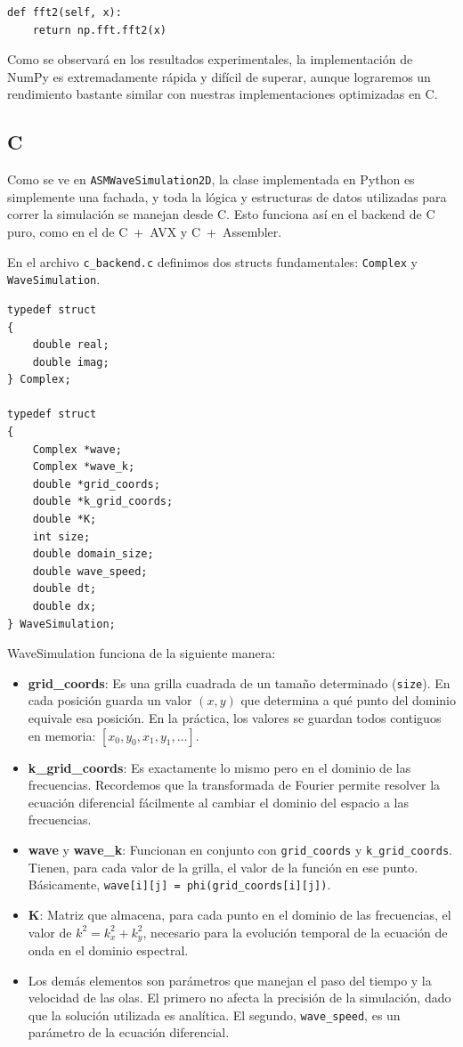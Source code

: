 \documentclass[a4paper]{article}
\begin{document}
\begin{verbatim}
def fft2(self, x):
    return np.fft.fft2(x)
\end{verbatim}

Como se observará en los resultados experimentales, la implementación de NumPy es extremadamente rápida y difícil de superar, aunque lograremos
un rendimiento bastante similar con nuestras implementaciones optimizadas en C.

\subsection{C}
Como se ve en \texttt{ASMWaveSimulation2D}, la clase implementada en Python es simplemente una fachada, y toda la lógica y estructuras de datos utilizadas para correr la simulación se manejan desde C. Esto funciona así en el backend de C puro, como en el de C~+~AVX y C~+~Assembler.

En el archivo \texttt{c\_backend.c} definimos dos structs fundamentales: \texttt{Complex} y \texttt{WaveSimulation}.

\begin{verbatim}
typedef struct
{
    double real;
    double imag;
} Complex;

typedef struct
{
    Complex *wave;
    Complex *wave_k;
    double *grid_coords;
    double *k_grid_coords;
    double *K;
    int size;
    double domain_size;
    double wave_speed;
    double dt;
    double dx;
} WaveSimulation;
\end{verbatim}

WaveSimulation funciona de la siguiente manera:
\begin{itemize}
    \item \textbf{grid\_coords}: Es una grilla cuadrada de un tamaño determinado (\texttt{size}). En cada posición guarda un valor $(x, y)$ que determina a qué punto del dominio equivale esa posición. En la práctica, los valores se guardan todos contiguos en memoria: $[x_0, y_0, x_1, y_1, \ldots]$.
    \item \textbf{k\_grid\_coords}: Es exactamente lo mismo pero en el dominio de las frecuencias. Recordemos que la transformada de Fourier permite resolver la ecuación diferencial fácilmente al cambiar el dominio del espacio a las frecuencias.
    \item \textbf{wave} y \textbf{wave\_k}: Funcionan en conjunto con \texttt{grid\_coords} y \texttt{k\_grid\_coords}. Tienen, para cada valor de la grilla, el valor de la función en ese punto. Básicamente, \texttt{wave[i][j] = phi(grid\_coords[i][j])}.
    \item \textbf{K}: Matriz que almacena, para cada punto en el dominio de las frecuencias, el valor de $k^2 = k_x^2 + k_y^2$, necesario para la evolución temporal de la ecuación de onda en el dominio espectral.
    \item Los demás elementos son parámetros que manejan el paso del tiempo y la velocidad de las olas. El primero no afecta la precisión de la simulación, dado que la solución utilizada es analítica. El segundo, \texttt{wave\_speed}, es un parámetro de la ecuación diferencial.
\end{itemize}
\end{document}
